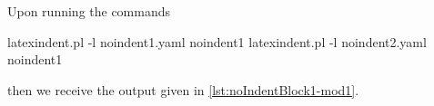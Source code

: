 Upon running the commands
\begin{commandshell}
latexindent.pl -l noindent1.yaml noindent1
latexindent.pl -l noindent2.yaml noindent1
\end{commandshell}
then we receive the output given in \cref{lst:noIndentBlock1-mod1}.
